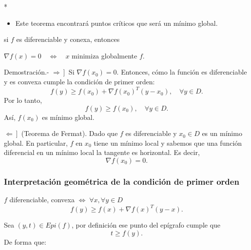 \begin{paracol}{2}
\switchcolumn[1]*{\noindent\scriptsize
    \begin{itemize}
	\item Este teorema encontrará puntos críticos que será un mínimo global.
    \end{itemize}
}
\switchcolumn[0]\noindent
\begin{teo} si $f$ es diferenciable y conexa, entonces
    \begin{center}
	$\nabla f(x)=0 \quad \Leftrightarrow \quad x$ minimiza globalmente $f$.
    \end{center}
    Demostración.-\; $\left. \Rightarrow \right]$ Si $\nabla f(x_0)=0$. Entonces, cómo la función es diferenciable y es convexa cumple la condición de primer orden:
	$$f(y)\geq f(x_0)+\nabla f(x_0)^T(y-x_0), \quad \forall y\in D.$$
    Por lo tanto,
    $$f(y)\geq f(x_0), \quad \forall y\in D.$$
    Así, $f(x_0)$ es mínimo global.

    $\left.\Leftarrow\right]$ (Teorema de Fermat). Dado que $f$ es diferenciable y $x_0\in D$ es un mínimo global. En particular, $f$ en $x_0$ tiene un mínimo local y sabemos que una función diferencial en un mínimo local la tangente es horizontal. Es decir, 
    $$\nabla f(x_0)=0.$$
\end{teo}

\subsubsection{Interpretación geométrica de la condición de primer orden}

$f$ diferenciable, convexa $\Leftrightarrow \; \forall x,\forall y\in D$
$$f(y)\geq f(x)+\nabla f(x)^T(y-x).$$

Sea $(y,t)\in Epi(f)$, por definición ese punto del epígrafo cumple que 
$$t\geq f(y).$$
De forma que:
\begin{center}
\end{center}


\end{paracol}
